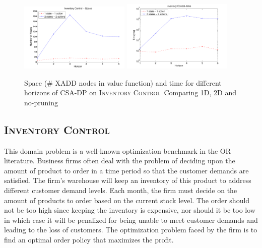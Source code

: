 \documentclass[letterpaper]{article}
\newcommand{\InventoryControl}{\textsc{Inventory Control}}
\begin{document}
\begin{figure}[t]
\centering
\includegraphics[width=0.47\textwidth]{Figures1/space1-2.pdf}
\hspace{5mm}
\includegraphics[width=0.47\textwidth]{Figures1/time1-2.pdf}
\caption{%
Space (\# XADD nodes in value function) and
time for different horizons of CSA-DP on \InventoryControl\ 
Comparing 1D, 2D and no-pruning}
\label{fig:invC}
\end{figure}

\subsection{\InventoryControl} 
This domain problem is a well-known optimization benchmark in the OR literature. Business firms often deal with the problem of deciding  upon the amount of product to order in a time period so that the customer demands are satisfied. The firm's warehouse will keep an inventory of this product to address different customer demand levels. Each month, the firm must decide on the amount of products to order based on the current stock level.
The order should not be too high since keeping the inventory is expensive, nor should it be too low in which case it will be penalized for being unable to meet customer demands and leading to the loss of customers. The optimization problem faced by the firm is to find an optimal order policy that maximizes the profit.~\cite{Mahootchi2009}
\end{document}
